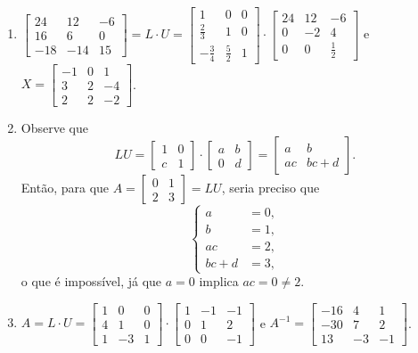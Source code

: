 \documentclass[12pt,a4paper]{article}
\begin{document}
\begin{enumerate}
\item $\begin{bmatrix}
 24 &  12 & -6\\
 16 &   6 &  0\\
-18 & -14 & 15
\end{bmatrix}
=L \cdot U =
\begin{bmatrix}
1&0&0\\
\frac{2}{3}&1&0\\
-\frac{3}{4}&\frac{5}{2}&1
\end{bmatrix}
\cdot
\begin{bmatrix}
24&12&-6\\
0&-2&4\\
0&0&\frac{1}{2}
\end{bmatrix}$
e
$X = \begin{bmatrix}
-1&0&1\\
3&2&-4\\
2&2&-2
\end{bmatrix}$.
\item Observe que
\[
L U
=
\begin{bmatrix}
1 & 0\\
c & 1
\end{bmatrix}
\cdot
\begin{bmatrix}
a & b\\
0 & d
\end{bmatrix}
=
\begin{bmatrix}
a & b\\
ac & bc + d
\end{bmatrix}.
\]
Então, para que $A=\begin{bmatrix}
0 & 1\\
2 & 3
\end{bmatrix} = LU$, seria preciso que
\[
\begin{cases}
   a &= 0,\\
   b &= 1,\\
   ac &= 2,\\
   bc + d &= 3,
\end{cases}
\]
o que é impossível, já que $a = 0$ implica $ac = 0 \neq 2$.

\item $A = L \cdot U =
\begin{bmatrix}
1&0&0\\4&1&0\\1&-3&1
\end{bmatrix}
\cdot
\begin{bmatrix}
1&-1&-1\\0&1&2\\0&0&-1
\end{bmatrix}$
e
$A^{-1} = \begin{bmatrix}
-16&4&1\\
-30&7&2\\
13&-3&-1
\end{bmatrix}$.


\end{enumerate}
\end{document}
